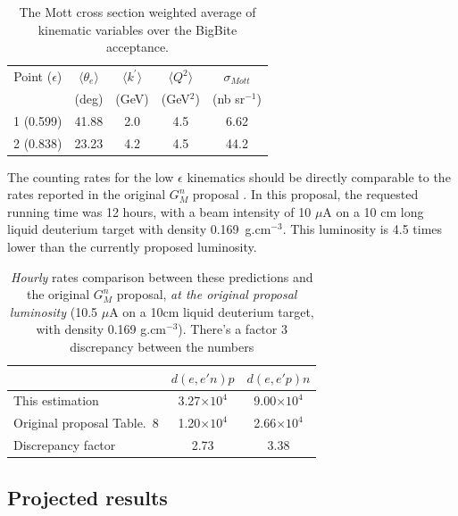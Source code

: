 \begin{table}[h]
\centering
\begin{tabular}{|c|c|c|c|c|}
\hline
Point ($\epsilon$) & $\langle \theta_e \rangle$ &  $\langle k^{\prime} \rangle$ & $\langle Q^2 \rangle$ & $\sigma_{Mott}$ \\
 & (deg) & (GeV) & (GeV$^2$) & (nb sr$^{-1}$) \\
\hline
1 (0.599) & 41.88 & 2.0 & 4.5 & 6.62 \\ 
\hline
2 (0.838) & 23.23 & 4.2 & 4.5 & 44.2 \\
\hline
\end{tabular} 
\caption{The Mott cross section weighted average of kinematic variables over the BigBite acceptance.}
\label{tab:sigma_mott}
\end{table}
%

The counting rates for the low $\epsilon$ kinematics should be directly comparable to the rates reported in the original $G_M^n$ proposal \cite{gmn}.
In this proposal, the requested running time was 12 hours, with a beam intensity of 10 $\mu$A on a 10 cm long liquid deuterium target with density 0.169~g.cm$^{-3}$.
This luminosity is 4.5 times lower than the currently proposed luminosity.
%
\begin{center}
\begin{table}[h]
\begin{tabular}{|l|c|c|}
\hline
 & $d(e, e'n)p$ & $d(e, e'p)n$ \\
\hline
This estimation & 3.27$\times 10^{4}$ & 9.00$\times 10^{4}$ \\
\hline
Original proposal Table.~8 & 1.20$\times 10^{4}$ & 2.66$\times 10^{4}$ \\ 
\hline
Discrepancy factor & 2.73 & 3.38 \\ 
\hline
\end{tabular} 
\caption{{\em Hourly} rates comparison between these predictions and the original $G_M^n$ proposal, {\em at the original proposal luminosity} (10.5 $\mu$A on a 10cm liquid deuterium target, with density 0.169 g.cm$^{-3}$). There's a factor 3 discrepancy between the numbers}
\label{tab:RateComp}
\end{table}
\end{center}
\fi

\subsection{Projected results}

